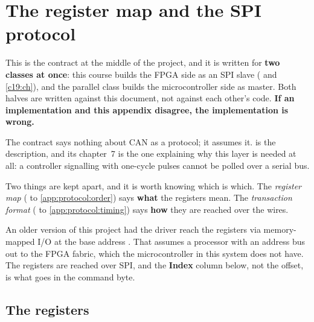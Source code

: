 
\chapter{The register map and the SPI protocol}
\label{app:protocol}

This is the contract at the middle of the project, and it is written for \textbf{two classes at
once}: this course builds the FPGA side as an SPI slave ( and \ref{c19:ch}), and the
parallel class builds the microcontroller side as master. Both halves are written against this
document, not against each other's code. \textbf{If an implementation and this appendix disagree, the
implementation is wrong.}

The contract says nothing about CAN as a protocol; it assumes it. \canbook{} is the description, and
its chapter~7 is the one explaining why this layer is needed at all: a controller signalling with
one-cycle pulses cannot be polled over a serial bus.

Two things are kept apart, and it is worth knowing which is which. The \emph{register map}
( to \ref{app:protocol:order}) says \textbf{what} the registers mean. The
\emph{transaction format} ( to \ref{app:protocol:timing}) says
\textbf{how} they are reached over the wires.

\begin{warning}
An older version of this project had the driver reach the registers via memory-mapped I/O at the base
address . That assumes a processor with an address bus out to the FPGA fabric, which
the microcontroller in this system does not have. The registers are reached over SPI, and the
\textbf{Index} column below, not the offset, is what goes in the command byte.
\end{warning}

\section{The registers}
\label{app:protocol:map}

